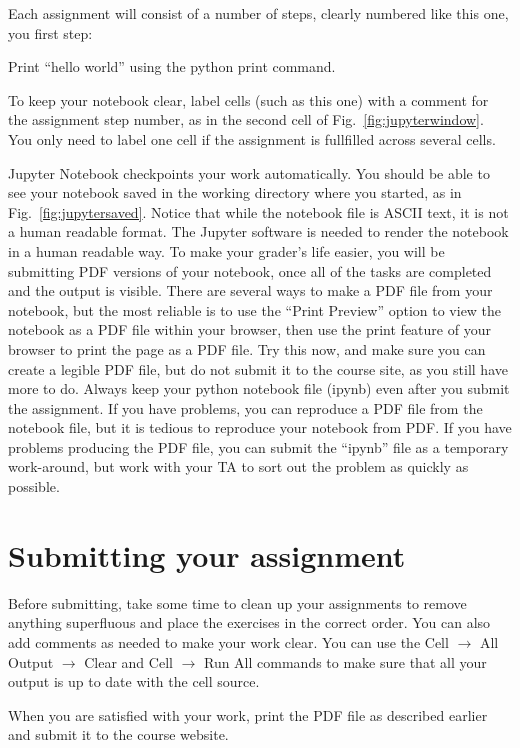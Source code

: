 Each assignment will consist of a number of steps, clearly numbered like this one, you first step:

\begin{plot}
\end{plot}
Print ``hello world'' using the python print command.

\noindent
To keep your notebook clear, label cells (such as this one) with a
comment for the assignment step number, as in the second cell of
Fig.~\ref{fig:jupyterwindow}.  You only need to label one cell if
the assignment is fullfilled across several cells.


Jupyter Notebook checkpoints your work automatically.  You should be
able to see your notebook saved in the working directory where you
started, as in Fig.~\ref{fig:jupytersaved}.  Notice that while the
notebook file is ASCII text, it is not a human readable format.  The
Jupyter software is needed to render the notebook in a human readable
way.  To make your grader's life easier, you will be submitting PDF
versions of your notebook, once all of the tasks are completed and the
output is visible.  There are several ways to make a PDF file from
your notebook, but the most reliable is to use the ``Print Preview''
option to view the notebook as a PDF file within your browser, then
use the print feature of your browser to print the page as a PDF file.
Try this now, and make sure you can create a legible PDF file, but do
not submit it to the course site, as you still have more to do.
Always keep your python notebook file (ipynb) even after you submit
the assignment.  If you have problems, you can reproduce a PDF file
from the notebook file, but it is tedious to reproduce your notebook
from PDF.  If you have problems producing the PDF file, you can submit
the ``ipynb'' file as a temporary work-around, but work with your TA
to sort out the problem as quickly as possible.





\section{Submitting your assignment}

Before submitting, take some time to clean up your assignments to
remove anything superfluous and place the exercises in the correct
order.  You can also add comments as needed to make your work clear.
You can use the Cell $\to$ All Output $\to$ Clear and Cell $\to$ Run
All commands to make sure that all your output is up to date with the
cell source.

When you are satisfied with your work, print the PDF file as described
earlier and submit it to the course website.









